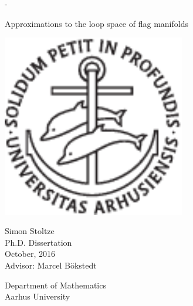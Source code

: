 \begin{titlingpage}
  \calccentering{\unitlength}
  \begin{adjustwidth*}{\unitlength}{-\unitlength}
    \begin{adjustwidth}{-1cm}{-1cm} 
      \vspace*{1cm}
      \centering
      \scshape
      
      {\Huge
        \begin{center}
          Approximations to the loop
          space of flag manifolds
        \end{center}
        }
      
      \vspace*{4.5\onelineskip}
      
      \includegraphics[width=8cm]{billeder/segla1s.pdf}    
      
      \vspace*{4.5\onelineskip}
      
      {\Large
        \linespread{1.4}\selectfont
        {\huge Simon Stoltze}\\
        \vspace{1em}
        Ph.D. Dissertation\\
        October, 2016 %
        \\ 
        \vspace{1em}
        Advisor: Marcel B\"okstedt}
      
      \strut\vfill
      Department of Mathematics\\
      Aarhus University
    \end{adjustwidth}
  \end{adjustwidth*}
  
\end{titlingpage}


